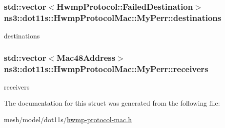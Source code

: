 \subsubsection[{\texorpdfstring{destinations}{destinations}}]{\setlength{\rightskip}{0pt plus 5cm}std\+::vector$<${\bf Hwmp\+Protocol\+::\+Failed\+Destination}$>$ ns3\+::dot11s\+::\+Hwmp\+Protocol\+Mac\+::\+My\+Perr\+::destinations}\hypertarget{structns3_1_1dot11s_1_1HwmpProtocolMac_1_1MyPerr_a160a43a10420461a9928aa25f5626dca}{}\label{structns3_1_1dot11s_1_1HwmpProtocolMac_1_1MyPerr_a160a43a10420461a9928aa25f5626dca}


destinations 

\subsubsection[{\texorpdfstring{receivers}{receivers}}]{\setlength{\rightskip}{0pt plus 5cm}std\+::vector$<${\bf Mac48\+Address}$>$ ns3\+::dot11s\+::\+Hwmp\+Protocol\+Mac\+::\+My\+Perr\+::receivers}\hypertarget{structns3_1_1dot11s_1_1HwmpProtocolMac_1_1MyPerr_a9ecf059f0bd93868766ad55de8402784}{}\label{structns3_1_1dot11s_1_1HwmpProtocolMac_1_1MyPerr_a9ecf059f0bd93868766ad55de8402784}


receivers 



The documentation for this struct was generated from the following file\+:\begin{DoxyCompactItemize}
\item 
mesh/model/dot11s/\hyperlink{hwmp-protocol-mac_8h}{hwmp-\/protocol-\/mac.\+h}\end{DoxyCompactItemize}
